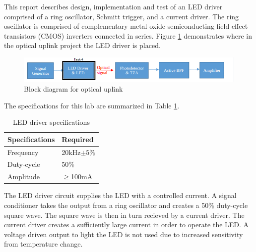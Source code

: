 




\noindent This report describes design, implementation and test of an LED driver comprised of a ring oscillator, Schmitt trigger, and a current driver. The ring oscillator is comprised of complementary metal oxide semiconducting field effect transistors (CMOS) inverters connected in series. Figure \ref{fig:blockdiagram2} demonstrates where in the optical uplink project the LED driver is placed. 



\begin{figure}[H]
    \centering
    \includegraphics[width=.9\textwidth ]{Introduction/Block_Diagram_MFBP.png}
    \caption{Block diagram for optical uplink \cite{b1}}
    \label{fig:blockdiagram2}
\end{figure}

The specifications for this lab are summarized in Table \ref{tab:specifications}.

\begin{table}[H]
	\centering
	\caption{LED driver specifications}
	\label{tab:specifications}
	\begin{tabular}{|l|l|}
		\hline
		Specifications & Required       \\ \hline
		Frequency      & 20kHz$\pm 5\%$ \\ \hline
		Duty-cycle     & 50\%           \\ \hline
		Amplitude      & $\geq$100mA    \\ \hline
	\end{tabular}
\end{table}


The LED driver circuit supplies the LED with a controlled current. A signal conditioner takes the output from a ring oscillator and creates a 50\% duty-cycle square wave. The square wave is then in turn recieved by a current driver. The current driver creates a sufficiently large current in order to operate the LED.  A voltage driven output to light the LED is not used due to increased sensitivity from temperature change. 



